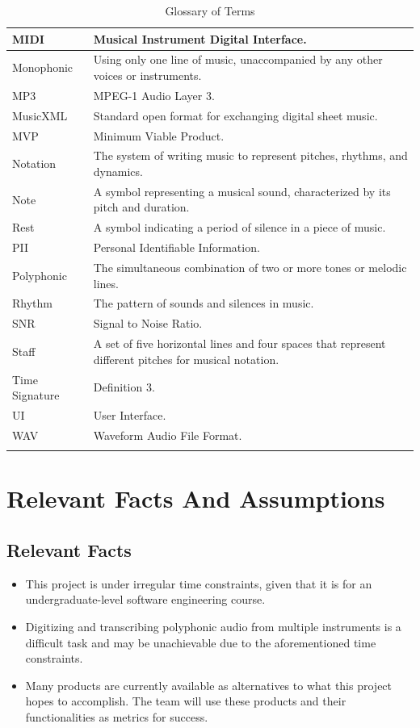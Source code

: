 \documentclass[12pt]{article}
\begin{document}
\begin{longtable}{|l|p{12cm}|}
\hline
MIDI & Musical Instrument Digital Interface. \\ 
\hline
Monophonic & Using only one line of music, unaccompanied by any other voices or instruments. \\ 
\hline
MP3 & MPEG-1 Audio Layer 3. \\ 
\hline
MusicXML & Standard open format for exchanging digital sheet music. \\ 
\hline
MVP & Minimum Viable Product. \\ 
\hline
Notation & The system of writing music to represent pitches, rhythms, and dynamics. \\ 
\hline
Note & A symbol representing a musical sound, characterized by its pitch and duration. \\ 
\hline
Rest & A symbol indicating a period of silence in a piece of music. \\ 
\hline
PII & Personal Identifiable Information. \\ 
\hline
Polyphonic & The simultaneous combination of two or more tones or melodic lines. \\ 
\hline
Rhythm & The pattern of sounds and silences in music. \\ 
\hline
SNR & Signal to Noise Ratio. \\ 
\hline
Staff & A set of five horizontal lines and four spaces that represent different pitches for musical notation. \\ 
\hline
Time Signature & Definition 3. \\ 
\hline
UI & User Interface. \\ 
\hline
WAV & Waveform Audio File Format. \\ 
\hline
\caption{Glossary of Terms}
\end{longtable}

\section{Relevant Facts And Assumptions}
\subsection{Relevant Facts}
\begin{itemize}
  \item This project is under irregular time constraints, given that it is 
  for an undergraduate-level software engineering course. 
  \item Digitizing and transcribing polyphonic audio from multiple instruments
   is a difficult task and may be unachievable due to the aforementioned time constraints. 
  \item Many products are currently available as alternatives to what this project hopes 
  to accomplish. The team will use these products and their functionalities as metrics for success.
\end{itemize}
\end{document}
